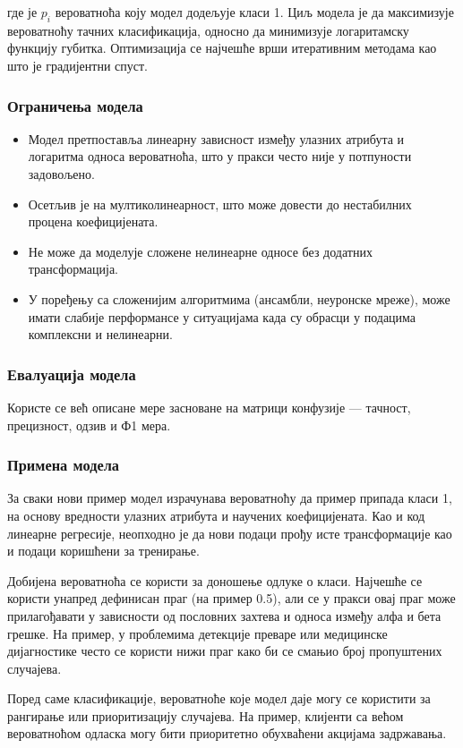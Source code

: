 где је $p_i$ вероватноћа коју модел додељује класи 1. Циљ модела је да максимизује вероватноћу тачних класификација, односно да минимизује логаритамску функцију губитка. Оптимизација се најчешће врши итеративним методама као што је градијентни спуст.

\subsubsection{Ограничења модела}
\begin{itemize}
  \item Модел претпоставља линеарну зависност између улазних атрибута и логаритма односа вероватноћа, што у пракси често није у потпуности задовољено.
  \item Осетљив је на мултиколинеарност, што може довести до нестабилних процена коефицијената.
  \item Не може да моделује сложене нелинеарне односе без додатних трансформација.
  \item У поређењу са сложенијим алгоритмима (ансамбли, неуронске мреже), може имати слабије перформансе у ситуацијама када су обрасци у подацима комплексни и нелинеарни.
\end{itemize}

\subsubsection{Евалуација модела}
Користе се већ описане мере засноване на матрици конфузије — тачност, прецизност, одзив и Ф1 мера.

\subsubsection{Примена модела}
За сваки нови пример модел израчунава вероватноћу да пример припада класи 1, на основу вредности улазних атрибута и научених коефицијената. Као и код линеарне регресије, неопходно је да нови подаци прођу исте трансформације као и подаци коришћени за тренирање.

Добијена вероватноћа се користи за доношење одлуке о класи. Најчешће се користи унапред дефинисан праг (на пример 0.5), али се у пракси овај праг може прилагођавати у зависности од пословних захтева и односа између алфа и бета грешке. На пример, у проблемима детекције преваре или медицинске дијагностике често се користи нижи праг како би се смањио број пропуштених случајева.

Поред саме класификације, вероватноће које модел даје могу се користити за рангирање или приоритизацију случајева. На пример, клијенти са већом вероватноћом одласка могу бити приоритетно обухваћени акцијама задржавања.

